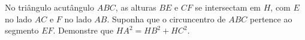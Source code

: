No triângulo acutângulo $ABC$, as alturas $BE$ e $CF$ se intersectam em $H$, com $E$ no lado $AC$ e $F$ no lado $AB$. Suponha que o circuncentro de $ABC$ pertence ao segmento $EF$. 
Demonstre que $HA^2 = HB^2 + HC^2$.
